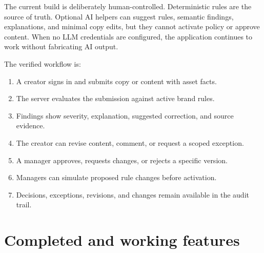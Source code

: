 \documentclass[11pt,a4paper]{article}
\begin{document}
The current build is deliberately human-controlled. Deterministic rules are the source of
truth. Optional AI helpers can suggest rules, semantic findings, explanations, and minimal
copy edits, but they cannot activate policy or approve content. When no LLM credentials
are configured, the application continues to work without fabricating AI output.

The verified workflow is:
\begin{enumerate}[leftmargin=*,itemsep=2pt]
  \item A creator signs in and submits copy or content with asset facts.
  \item The server evaluates the submission against active brand rules.
  \item Findings show severity, explanation, suggested correction, and source evidence.
  \item The creator can revise content, comment, or request a scoped exception.
  \item A manager approves, requests changes, or rejects a specific version.
  \item Managers can simulate proposed rule changes before activation.
  \item Decisions, exceptions, revisions, and changes remain available in the audit trail.
\end{enumerate}

\section{Completed and working features}
\end{document}

